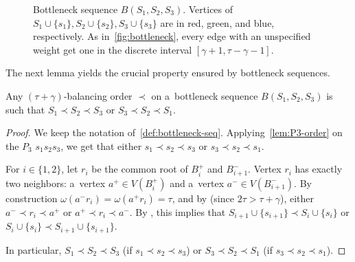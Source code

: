 \documentclass[a4paper,UKenglish,cleveref,hyperref,autoref]{lipics-v2021}
\newcommand{\weight}{\omega}
\begin{document}
\begin{figure}[h!]
  \caption{Bottleneck sequence $B(S_1,S_2,S_3)$.
    Vertices of $S_1 \cup \{s_1\}, S_2 \cup \{s_2\}, S_3 \cup \{s_3\}$ are in red, green, and blue, respectively.
    As in~\cref{fig:bottleneck}, every edge with an unspecified weight get one in the discrete interval $[\gamma+1,\tau-\gamma-1]$.}
\label{fig:bottleneck-sequence}
\end{figure}
The next lemma yields the crucial property ensured by bottleneck sequences.

\begin{lemma}\label{lem:Forcing-the-order}
Any $(\tau + \gamma)$-balancing order $\prec$ on a~bottleneck sequence $B(S_1, S_2, S_3)$ is such that $S_1 \prec S_2 \prec S_3$ or $S_3 \prec S_2 \prec S_1$.
\end{lemma}
\begin{proof}
  We keep the notation of~\cref{def:bottleneck-seq}.
Applying~\cref{lem:P3-order} on the $P_3$ $s_1s_2s_3$, we get that either $s_1 \prec s_2 \prec s_3$ or $s_3 \prec s_2 \prec s_1$.

For $i \in \{1,2\}$, let $r_i$ be the common root of $B_i^+$ and $B_{i+1}^-$.
Vertex $r_i$ has exactly two neighbors: a~vertex $a^+ \in V(B_i^+)$ and a~vertex $a^- \in V(B_{i+1}^-)$.
By construction $\weight(a^-r_i) = \weight(a^+r_i)= \tau$, and by  (since $2 \tau > \tau + \gamma$), either $a^- \prec r_i \prec a^+$ or $a^+ \prec r_i \prec a^-$.
By , this implies that $S_{i+1} \cup \{s_{i+1}\} \prec S_i \cup \{s_i\}$ or $S_i \cup \{s_i\} \prec S_{i+1} \cup \{s_{i+1}\}$.

In particular, $S_1 \prec S_2 \prec S_3$ (if $s_1 \prec s_2 \prec s_3$) or  $S_3 \prec S_2 \prec S_1$ (if $s_3 \prec s_2 \prec s_1$).
\end{proof}
\end{document}
